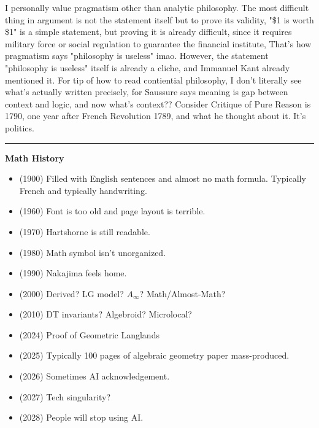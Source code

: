 \documentclass{article}
\begin{document}
\noindent
I personally value pragmatism other than analytic philosophy.
The most difficult thing in argument is not the statement itself but to prove its validity,
"\$1 is worth \$1" is a simple statement, but proving it is already difficult, 
since it requires military force or social regulation to guarantee the financial institute,
That's how pragmatism says "philosophy is useless" imao.
However, the statement "philosophy is useless" itself is already a cliche, and Immanuel Kant already mentioned it.
For tip of how to read contiential philosophy, I don't literally see what's actually written precisely, for
Saussure says meaning is gap between context and logic, and now what's context??
Consider Critique of Pure Reason is 1790, one year after French Revolution 1789, and what he thought about it. It's politics. \\




%
%




\noindent\rule{\textwidth}{0.4pt}

\noindent
\textbf{Math History}

\begin{itemize}
\item (1900) Filled with English sentences and almost no math formula. Typically French and typically handwriting.
\item (1960) Font is too old and page layout is terrible.
\item (1970) Hartshorne is still readable.
\item (1980) Math symbol isn't unorganized.
\item (1990) Nakajima feels home.
\item (2000) Derived? LG model? $A_\infty$? Math/Almost-Math?
\item (2010) DT invariants? Algebroid? Microlocal?
\item (2024) Proof of Geometric Langlands
\item (2025) Typically 100 pages of algebraic geometry paper mass-produced.
\item (2026) Sometimes AI acknowledgement.
\item (2027) Tech singularity?
\item (2028) People will stop using AI.
\end{itemize}
\end{document}
